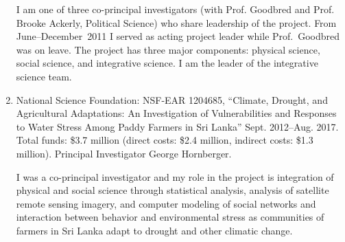 \begin{enumerate}
	\begin{credit}
	I am one of three co-principal investigators (with Prof. Goodbred and Prof. Brooke Ackerly, Political Science) who share leadership of the project. From June--December~2011 I served as acting project leader while Prof.~Goodbred was on leave. The project has three major components: physical science, social science, and integrative science. I am the leader of the integrative science team.
	\end{credit}
	\item National Science Foundation: NSF-EAR 1204685, ``Climate, Drought, and Agricultural Adaptations: An Investigation of Vulnerabilities and Responses to Water Stress Among Paddy Farmers in Sri Lanka'' Sept. 2012--Aug. 2017. Total funds: \$3.7 million (direct costs: \$2.4 million, indirect costs: \$1.3 million). Principal Investigator George Hornberger.
	\begin{credit}
	I was a co-principal investigator and my role in the project is integration of physical and social science through statistical analysis, analysis of satellite remote sensing imagery, and computer modeling of social networks and interaction between behavior and environmental stress as communities of farmers in Sri Lanka adapt to drought and other climatic change.
	\end{credit}
\end{enumerate}
\iffalse
